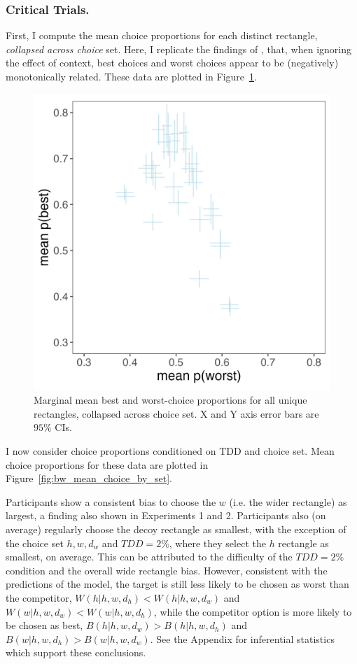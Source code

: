 \subsubsection{Critical Trials.}

First, I compute the mean choice proportions for each distinct rectangle, \textit{collapsed across choice} set. Here, I replicate the findings of \textcite{hawkinsBestTimesWorst2014}, that, when ignoring the effect of context, best choices and worst choices appear to be (negatively) monotonically related. These data are plotted in Figure~\ref{fig:bw_marginal}.

\begin{figure}
   \includegraphics[width=\linewidth]{figures/crit_mean_props_marginal.jpeg}
   \caption{Marginal mean best and worst-choice proportions for all unique rectangles, collapsed across choice set. X and Y axis error bars are $95\%$ CIs.}
   \label{fig:bw_marginal}
\end{figure}

I now consider choice proportions conditioned on TDD and choice set. Mean choice proportions for these data are plotted in Figure~\ref{fig:bw_mean_choice_by_set}. 

Participants show a consistent bias to choose the $w$ (i.e. the wider rectangle) as largest, a finding also shown in Experiments 1 and 2. Participants also (on average) regularly choose the decoy rectangle as smallest, with the exception of the choice set $h,w,d_{w}$ and $TDD=2\%$, where they select the $h$ rectangle as smallest, on average. This can be attributed to the difficulty of the $TDD=2\%$ condition and the overall wide rectangle bias. However, consistent with the predictions of the model, the target is still less likely to be chosen as worst than the competitor, $W(h|{h,w,d_{h}})<W(h|{h,w,d_{w}})$ and $W(w|{h,w,d_{w}})<W(w|{h,w,d_{h}})$, while the competitor option is more likely to be chosen as best, $B(h|{h,w,d_{w}})>B(h|{h,w,d_{h}})$ and $B(w|{h,w,d_{h}})>B(w|{h,w,d_{w}})$. See the Appendix for inferential statistics which support these conclusions.

